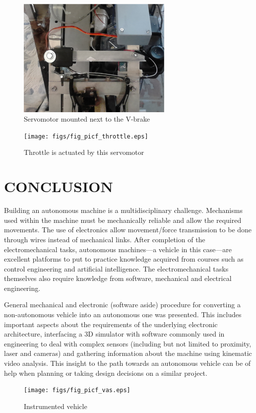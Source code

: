 \documentclass[twocolumn,10pt]{asme2e}
\begin{document}
\begin{figure}
\begin{center}
\includegraphics[width=7.5cm]{figs/fig_picf_brake.eps}
\caption{Servomotor mounted next to the V-brake}
\label{figs/fig_picf_brake}
\end{center}
\end{figure}

\begin{figure}
\begin{center}
\texttt{[image: figs/fig\_picf\_throttle.eps]}
\caption{Throttle is actuated by this servomotor}
\label{figs/fig_picf_throttle}
\end{center}
\end{figure}

\section*{CONCLUSION}

Building an autonomous machine is a multidisciplinary challenge. Mechanisms used within the machine must be mechanically reliable and allow the required movements. The use of electronics allow movement/force transmission to be done through wires instead of mechanical links. After completion of the electromechanical tasks, autonomous machines---a vehicle in this case---are excellent platforms to put to practice knowledge acquired from courses such as control engineering and artificial intelligence. The electromechanical tasks themselves also require knowledge from software, mechanical and electrical engineering.

General mechanical and electronic (software aside) procedure for converting a non-autonomous vehicle into an autonomous one was presented. This includes important aspects about the requirements of the underlying electronic architecture, interfacing a 3D simulator with software commonly used in engineering to deal with complex sensors (including but not limited to proximity, laser and cameras) and gathering information about the machine using kinematic video analysis. This insight to the path towards an autonomous vehicle can be of help when planning or taking design decisions on a similar project.

\begin{figure}
\begin{center}
\texttt{[image: figs/fig\_picf\_vas.eps]}
\caption{Instrumented vehicle}
\label{figs/fig_picf_vas}
\end{center}
\end{figure}



\end{document}
